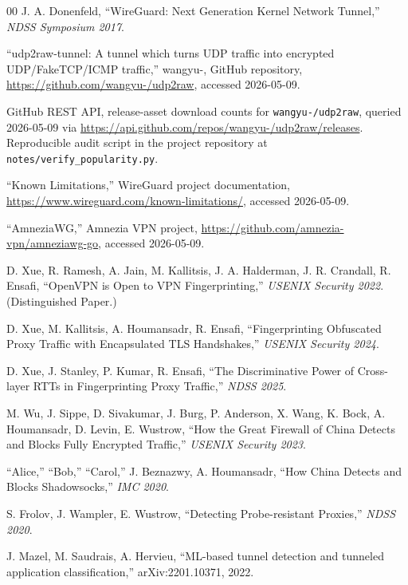 \documentclass[conference]{IEEEtran}
\begin{document}
\begin{thebibliography}{00}
 J. A. Donenfeld, ``WireGuard: Next Generation
Kernel Network Tunnel,'' \textit{NDSS Symposium 2017}.

 ``udp2raw-tunnel: A tunnel which turns UDP traffic into
encrypted UDP/FakeTCP/ICMP traffic,'' wangyu-, GitHub repository,
\url{https://github.com/wangyu-/udp2raw}, accessed 2026-05-09.

 GitHub REST API, release-asset download counts for
\texttt{wangyu-/udp2raw}, queried 2026-05-09 via
\url{https://api.github.com/repos/wangyu-/udp2raw/releases}.
Reproducible audit script in the project repository at
\texttt{notes/verify\_popularity.py}.

 ``Known Limitations,'' WireGuard project documentation,
\url{https://www.wireguard.com/known-limitations/}, accessed 2026-05-09.

 ``AmneziaWG,'' Amnezia VPN project,
\url{https://github.com/amnezia-vpn/amneziawg-go}, accessed 2026-05-09.

 D. Xue, R. Ramesh, A. Jain, M. Kallitsis,
J. A. Halderman, J. R. Crandall, R. Ensafi, ``OpenVPN is Open to VPN
Fingerprinting,'' \textit{USENIX Security 2022}. (Distinguished Paper.)

 D. Xue, M. Kallitsis, A. Houmansadr,
R. Ensafi, ``Fingerprinting Obfuscated Proxy Traffic with Encapsulated
TLS Handshakes,'' \textit{USENIX Security 2024}.

 D. Xue, J. Stanley, P. Kumar, R. Ensafi,
``The Discriminative Power of Cross-layer RTTs in Fingerprinting Proxy
Traffic,'' \textit{NDSS 2025}.

 M. Wu, J. Sippe, D. Sivakumar, J. Burg, P. Anderson,
X. Wang, K. Bock, A. Houmansadr, D. Levin, E. Wustrow, ``How the Great
Firewall of China Detects and Blocks Fully Encrypted Traffic,''
\textit{USENIX Security 2023}.

 ``Alice,'' ``Bob,'' ``Carol,'' J. Beznazwy,
A. Houmansadr, ``How China Detects and Blocks Shadowsocks,''
\textit{IMC 2020}.

 S. Frolov, J. Wampler, E. Wustrow, ``Detecting
Probe-resistant Proxies,'' \textit{NDSS 2020}.

 J. Mazel, M. Saudrais, A. Hervieu, ``ML-based tunnel
detection and tunneled application classification,'' arXiv:2201.10371,
2022.


\end{thebibliography}
\end{document}

